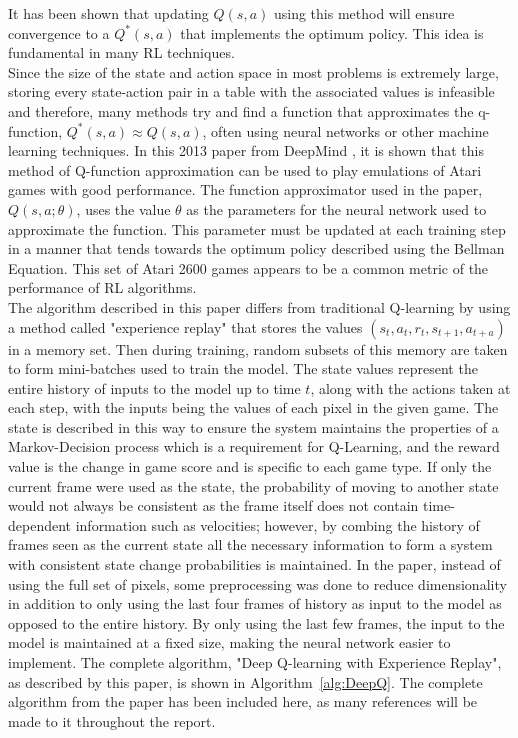 \documentclass{article}
\begin{document}
It has been shown that updating $Q(s,a)$ using this method will ensure convergence to a $Q^*(s,a)$ that implements the optimum policy\cite{Watkins1992Q-Learning}. This idea is fundamental in many RL techniques.
\\
Since the size of the state and action space in most problems is extremely large, storing every state-action pair in a table with the associated values is infeasible and therefore, many methods try and find a function that approximates the q-function, $Q^*(s,a) \approx Q(s,a)$, often using neural networks or other machine learning techniques. In this 2013 paper from DeepMind \cite{MnihPlayingLearning}, it is shown that this method of Q-function approximation can be used to play emulations of Atari games with good performance. The function approximator used in the paper, $Q(s,a ; \theta)$, uses the value $\theta$ as the parameters for the neural network used to approximate the function. This parameter must be updated at each training step in a manner that tends towards the optimum policy described using the Bellman Equation. This set of Atari 2600 games appears to be a common metric of the performance of RL algorithms. 
\\ 
\sloppy The algorithm described in this paper differs from traditional Q-learning\cite{SuttonReinforcementProgress} by using a method called "experience replay" that stores the values $(s_t, a_t, r_t, s_{t+1}, a_{t+a})$ in a memory set. Then during training, random subsets of this memory are taken to form mini-batches used to train the model. The state values represent the entire history of inputs to the model up to time $t$, along with the actions taken at each step, with the inputs being the values of each pixel in the given game. The state is described in this way to ensure the system  maintains the properties of a Markov-Decision process which is a requirement for Q-Learning, and the reward value is the change in game score and is specific to each game type. If only the current frame were used as the state, the probability of moving to another state would not always be consistent as the frame itself does not contain time-dependent information such as velocities; however, by combing the history of frames seen as the current state all the necessary information to form a system with consistent state change probabilities is maintained.  In the paper, instead of using the full set of pixels, some preprocessing was done to reduce dimensionality in addition to only using the last four frames of history as input to the model as opposed to the entire history. By only using the last few frames, the input to the model is maintained at a fixed size, making the neural network easier to implement. The complete algorithm, "Deep Q-learning with Experience Replay", as described by this paper, is shown in Algorithm~\ref{alg:DeepQ}. The complete algorithm from the paper has been included here, as many references will be made to it throughout the report. 
\end{document}
